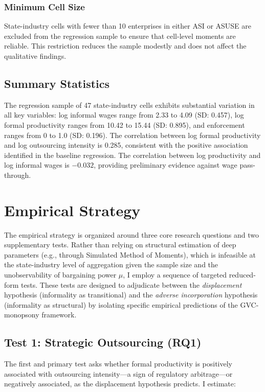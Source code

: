 \subsubsection{Minimum Cell Size}

State-industry cells with fewer than 10 enterprises in either ASI or ASUSE are excluded from the regression sample to ensure that cell-level moments are reliable. This restriction reduces the sample modestly and does not affect the qualitative findings.

\subsection{Summary Statistics}

The regression sample of 47 state-industry cells exhibits substantial variation in all key variables: log informal wages range from 2.33 to 4.09 (SD: 0.457), log formal productivity ranges from 10.42 to 15.44 (SD: 0.895), and enforcement ranges from 0 to 1.0 (SD: 0.196). The correlation between log formal productivity and log outsourcing intensity is 0.285, consistent with the positive association identified in the baseline regression. The correlation between log productivity and log informal wages is $-0.032$, providing preliminary evidence against wage pass-through.

\section{Empirical Strategy}
\label{sec:empirical_strategy}

The empirical strategy is organized around three core research questions and two supplementary tests. Rather than relying on structural estimation of deep parameters (e.g., through Simulated Method of Moments), which is infeasible at the state-industry level of aggregation given the sample size and the unobservability of bargaining power $\mu$, I employ a sequence of targeted reduced-form tests. These tests are designed to adjudicate between the \textit{displacement} hypothesis (informality as transitional) and the \textit{adverse incorporation} hypothesis (informality as structural) by isolating specific empirical predictions of the GVC-monopsony framework.

\subsection{Test 1: Strategic Outsourcing (RQ1)}

The first and primary test asks whether formal productivity is positively associated with outsourcing intensity—a sign of regulatory arbitrage—or negatively associated, as the displacement hypothesis predicts. I estimate:

